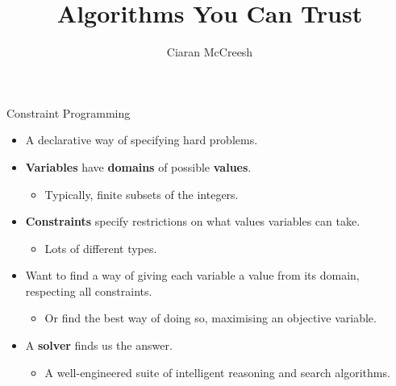 \documentclass[aspectratio=169,compress,10pt]{beamer}
\author{Ciaran McCreesh}
\title{Algorithms You Can Trust}
\begin{document}
{
    \begin{frame}
        \titlepage
    \end{frame}
}

\begin{frame}{Constraint Programming}
    \begin{itemize}
        \item A declarative way of specifying hard problems.
        \item \textbf{Variables} have \textbf{domains} of possible \textbf{values}.
            \begin{itemize}
                \item Typically, finite subsets of the integers.
            \end{itemize}
        \item \textbf{Constraints} specify restrictions on what values variables can take.
            \begin{itemize}
                \item Lots of different types.
            \end{itemize}
        \item Want to find a way of giving each variable a value from its domain, respecting all
            constraints.
            \begin{itemize}
                \item Or find the best way of doing so, maximising an objective variable.
            \end{itemize}
        \item A \textbf{solver} finds us the answer.
            \begin{itemize}
                \item A well-engineered suite of intelligent reasoning and search algorithms.
            \end{itemize}
    \end{itemize}
\end{frame}
\end{document}
